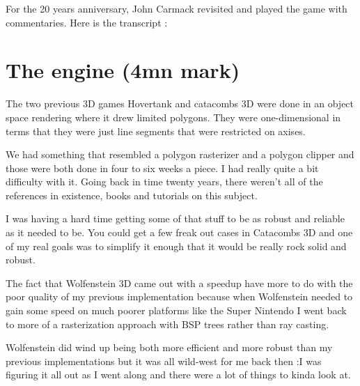 \documentclass[book.tex]{subfiles}
\begin{document}
For the 20 years anniversary, John Carmack revisited and played the game with commentaries. Here is the transcript :


   
\section{The engine (4mn mark)}

The two previous 3D games Hovertank and catacombs 3D were done in an object space rendering where it drew limited polygons. They were one-dimensional in terms that they were just line segments that were restricted on axises.\\
\par
We had something that resembled a polygon rasterizer and a polygon clipper and those were both done in four to six weeks a piece. I had really quite a bit difficulty with it. Going back in time twenty years, there weren't all of the references in existence, books and tutorials on this subject.\\
\par
I was having a hard time getting some of that stuff to be as robust
and reliable as it needed to be. You could get a few freak out cases
in Catacombs 3D and one of my real goals was to simplify it enough
that it would be really rock solid and robust.\\
\par

The fact that Wolfenstein 3D came out with a speedup have more to do with the poor quality of my previous implementation because when Wolfenstein  needed to gain some speed on much poorer platforms like the Super Nintendo I went back to more of a rasterization approach with BSP trees rather than ray casting.\\
\par

Wolfenstein did wind up being both more efficient and more robust than my previous implementations but it was all wild-west for me back then :I was figuring it  all out as I went along and there were a lot of things to kinda look at.\\
\par
\end{document}
